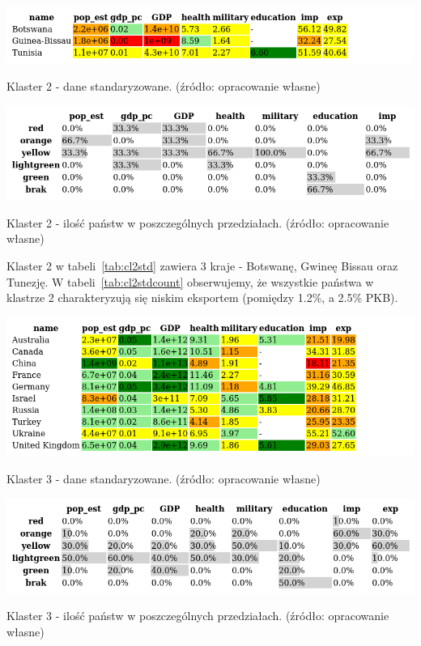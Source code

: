 \documentclass[11pt]{report}
\begin{document}
    \begin{table}[!htp]
        \centering
        \includegraphics[width=\linewidth]{tables/CLUST/cluster2stdkmeans.png}
        \caption{Klaster 2 - dane standaryzowane. (źródło: opracowanie własne)}
        \label{tab:cl2std}
    \end{table}

    \begin{table}[!htp]
        \centering
        \includegraphics[width=\linewidth]{tables/CLUST/cluster2stdkmeanscount.png}
        \caption{Klaster 2 - ilość państw w poszczególnych przedziałach. (źródło: opracowanie własne)}
        \label{tab:cl2stdcount}
    \end{table}

    Klaster 2 w tabeli~\ref{tab:cl2std} zawiera 3 kraje - Botswanę, Gwineę Bissau oraz Tunezję.
    W tabeli~\ref{tab:cl2stdcount} obserwujemy, że wszystkie państwa w klastrze 2 charakteryzują się niskim eksportem (pomiędzy 1.2\%, a 2.5\% PKB).

    \begin{table}[!htp]
        \centering
        \includegraphics[width=\linewidth]{tables/CLUST/cluster3stdkmeans.png}
        \caption{Klaster 3 - dane standaryzowane. (źródło: opracowanie własne)}
        \label{tab:cl3std}
    \end{table}

    \begin{table}[!htp]
        \centering
        \includegraphics[width=\linewidth]{tables/CLUST/cluster3stdkmeanscount.png}
        \caption{Klaster 3 - ilość państw w poszczególnych przedziałach. (źródło: opracowanie własne)}
        \label{tab:cl3stdcount}
    \end{table}
\end{document}
